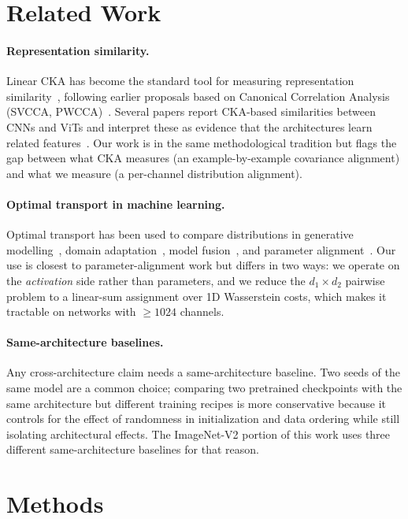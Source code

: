 \documentclass[11pt]{article}
\begin{document}
\section{Related Work}

\paragraph{Representation similarity.} Linear CKA has become the
standard tool for measuring representation similarity~\cite{kornblith2019similarity},
following earlier proposals based on Canonical Correlation Analysis
(SVCCA, PWCCA)~\cite{raghu2017svcca,morcos2018pwcca}. Several papers
report CKA-based similarities between CNNs and ViTs and interpret these
as evidence that the architectures learn related
features~\cite{raghu2021vits,nguyen2021do}. Our work is in the same
methodological tradition but flags the gap between what CKA measures
(an example-by-example covariance alignment) and what we measure
(a per-channel distribution alignment).

\paragraph{Optimal transport in machine learning.} Optimal transport
has been used to compare distributions in
generative modelling~\cite{arjovsky2017wgan}, domain
adaptation~\cite{courty2017otda}, model fusion~\cite{singh2020fusion},
and parameter alignment~\cite{liu2022deep}. Our use is closest to
parameter-alignment work but differs in two ways: we operate on the
\emph{activation} side rather than parameters, and we reduce the
$d_1 \times d_2$ pairwise problem to a linear-sum assignment over
1D Wasserstein costs, which makes it tractable on networks with
$\ge 1024$ channels.

\paragraph{Same-architecture baselines.} Any cross-architecture claim
needs a same-architecture baseline. Two seeds of the same model are a
common choice; comparing two pretrained checkpoints with the same
architecture but different training recipes is more conservative because
it controls for the effect of randomness in initialization and
data ordering while still isolating architectural effects. The
ImageNet-V2 portion of this work uses three different same-architecture
baselines for that reason.

\section{Methods}
\end{document}
